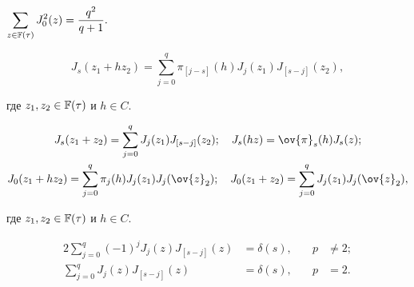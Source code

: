 \begin{props}


$\displaystyle\sum\limits_{z\in {\Bbb F(\tau)}}{J_0^2(z)=\frac{q^2}{q+1}}.$


\end{props}





\begin{props}


$$


J_s(z_1+hz_2)=\sum_{j=0}^q{\pi_{[j-s]}(h)J_j(z_1)J_{[s-j]}(z_2)},


$$


где $z_1,z_2\in{\Bbb F(\tau)}$ и $h\in C$.


\end{props}





\begin{cors}


\begin{gather*}


J_s(z_1+z_2)=\sum_{j=0}^q{J_j(z_1)J_{[s-j]}(z_2)};\quad


J_s(hz)={\ov{\pi}_s(h)J_s(z)};\\


J_0(z_1+hz_2)=\sum_{j=0}^q{{\pi_j}(h)J_j(z_1)J_j(\ov{z}_2)};\quad


J_0(z_1+z_2)=\sum_{j=0}^q{J_j(z_1)J_j(\ov{z}_2)},


\end{gather*}


где $z_1,z_2\in{\Bbb F(\tau)}$ и $h\in C$.


\end{cors}





\begin{props}


\begin{alignat*}{2}


\sum_{j=0}^q{(-1)^jJ_j(z)J_{[s-j]}(z)}&=\delta(s),&\quad p&\neq2;\\


\sum_{j=0}^q{J_j(z)J_{[s-j]}(z)}&=\delta(s), &\quad p&=2.


\end{alignat*}


\end{props}





